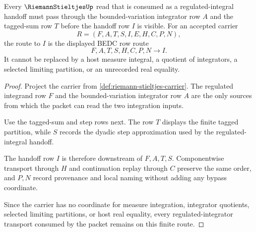 \begin{theorem}
\label{thm:riemann-stieltjes-regulated-integrator-transport}
Every $\RiemannStieltjesUp$ read that is consumed as a regulated-integral handoff must pass through the bounded-variation integrator row $A$ and the tagged-sum row $T$ before the handoff row $I$ is visible. For an accepted carrier
$$
R=(F,A,T,S,I,E,H,C,P,N),
$$
the route to $I$ is the displayed BEDC row route
$$
F,A,T,S,H,C,P,N \longrightarrow I .
$$
It cannot be replaced by a host measure integral, a quotient of integrators, a selected limiting partition, or an unrecorded real equality.
\end{theorem}
\begin{proof}
Project the carrier from \autoref{def:riemann-stieltjes-carrier}. The regulated integrand row $F$ and the bounded-variation integrator row $A$ are the only sources from which the packet can read the two integration inputs.

Use the tagged-sum and step rows next. The row $T$ displays the finite tagged partition, while $S$ records the dyadic step approximation used by the regulated-integral handoff.

The handoff row $I$ is therefore downstream of $F,A,T,S$. Componentwise transport through $H$ and continuation replay through $C$ preserve the same order, and $P,N$ record provenance and local naming without adding any bypass coordinate.

Since the carrier has no coordinate for measure integration, integrator quotients, selected limiting partitions, or host real equality, every regulated-integrator transport consumed by the packet remains on this finite route.
\end{proof}

